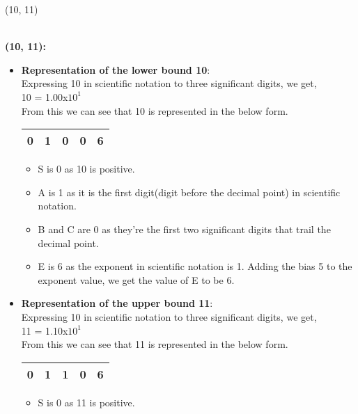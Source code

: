 \documentclass[letterpaper]{exam}
\begin{document}
\begin{questions}
\begin{parts}
\begin{subparts}
\begin{solution}
\begin{itemize}
	\end{itemize}
	\end{solution}
	\subpart (10, 11)
	\begin{solution}
	\\
	\textbf{(10, 11):}
	\begin{itemize}
	    \item \textbf{Representation of the lower bound 10}:\\
	    Expressing 10 in scientific notation to three significant digits, we get,\\
	    10 = 1.00x$10^1$\\
	    From this we can see that 10 is represented in the below form.
	    \begin{center}
\begin{tabular}{|c|c|c|c|c|}
\hline
     \huge{\color{red}0}&\huge{\color{green}1}&\huge{\color{green}0}&\huge{\color{green}0}&\huge{\color{yellow}6}  \\[0.5ex]
\hline
\end{tabular}
\end{center}
\begin{itemize}
\item S is 0 as 10 is positive.
\item A is 1 as it is the first digit(digit before the decimal point) in scientific notation.
\item B and C are 0 as they're the first two significant digits that trail the decimal point.
\item E is 6 as the exponent in scientific notation is 1. Adding the bias 5 to the exponent value, we get the value of E to be 6.
\end{itemize}
\item \textbf{Representation of the upper bound 11}:\\
	    Expressing 10 in scientific notation to three significant digits, we get,\\
	    11 = 1.10x$10^1$\\
	    From this we can see that 11 is represented in the below form.
	    \begin{center}
\begin{tabular}{|c|c|c|c|c|}
\hline
     \huge{\color{red}0}&\huge{\color{green}1}&\huge{\color{green}1}&\huge{\color{green}0}&\huge{\color{yellow}6}  \\[0.5ex]
\hline
\end{tabular}
\end{center}
\begin{itemize}
\item S is 0 as 11 is positive.

\end{itemize}
\end{itemize}
\end{solution}
\end{subparts}
\end{parts}
\end{questions}
\end{document}
